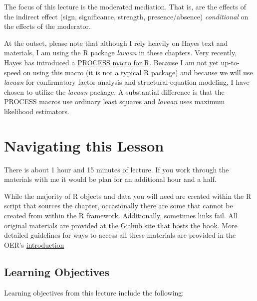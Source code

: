 \documentclass[
  english,
]{book}
\begin{document}
The focus of this lecture is the moderated mediation. That is, are the effects of the indirect effect (sign, significance, strength, presence/absence) \emph{conditional} on the effects of the moderator.

At the outset, please note that although I rely heavily on Hayes \citeyearpar{hayes_introduction_2018} text and materials, I am using the R package \emph{lavaan} in these chapters. Very recently, Hayes has introduced a \href{https://www.processmacro.org/index.html}{PROCESS macro for R}. Because I am not yet up-to-speed on using this macro (it is not a typical R package) and because we will use \emph{lavaan} for confirmatory factor analysis and structural equation modeling, I have chosen to utilize the \emph{lavaan} package. A substantial difference is that the PROCESS macros use ordinary least squares and \emph{lavaan} uses maximum likelihood estimators.

\hypertarget{navigating-this-lesson-6}{%
\section{Navigating this Lesson}\label{navigating-this-lesson-6}}

There is about 1 hour and 15 minutes of lecture. If you work through the materials with me it would be plan for an additional hour and a half.

While the majority of R objects and data you will need are created within the R script that sources the chapter, occasionally there are some that cannot be created from within the R framework. Additionally, sometimes links fail. All original materials are provided at the \href{https://https://github.com/lhbikos/ReC_MultivModel}{Github site} that hosts the book. More detailed guidelines for ways to access all these materials are provided in the OER's \protect\hyperlink{ReCintro}{introduction}

\hypertarget{learning-objectives-6}{%
\subsection{Learning Objectives}\label{learning-objectives-6}}

Learning objectives from this lecture include the following:
\end{document}
